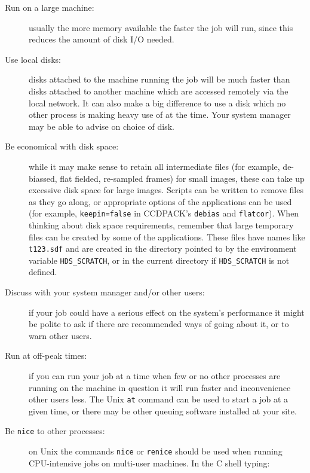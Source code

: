 \documentclass[twoside,11pt]{starlink}
\begin{document}
\begin{description}

  \item[Run on a large machine:] usually the more memory available the
   faster the job will run, since this reduces the amount of disk I/O needed.

  \item[Use local disks:] disks attached to the machine running the job will
   be much faster than disks attached to another machine which are accessed
   remotely via the local network.
   It can also make a big difference to use a disk which
   no other process is making heavy use of at the time.
   Your system manager may be able to advise on choice of disk.

  \item[Be economical with disk space:] while it may make sense to retain
   all intermediate files (for example, de-biassed, flat fielded, re-sampled
   frames) for small images, these can take up excessive disk space
   for large images.
   Scripts can be written to remove files as they go along,
   or appropriate options of the applications can be used
   (for example, \texttt{keepin=false} in CCDPACK's \texttt{debias} and \texttt{flatcor}).
   When thinking about disk space requirements,
   remember that large temporary files can be created by
   some of the applications.
   These files have names like \texttt{t123.sdf} and are created in the
   directory pointed to by the environment variable \texttt{HDS\_SCRATCH},
   or in the current directory if \texttt{HDS\_SCRATCH} is not defined.

  \item[Discuss with your system manager and/or other users:] if your job
   could have a serious effect on the system's performance it might be
   polite to ask if there are recommended ways of going about it, or to
   warn other users.

  \item[Run at off-peak times:] if you can run your job at a time when few
   or no other processes are running on the machine in question it will
   run faster and inconvenience other users less.
   The Unix \texttt{at} command can be used to start a job at a given time, or
   there may be other queuing software installed at your site.

  \item[Be \texttt{nice} to other processes:] on Unix the commands \texttt{nice}
   or \texttt{renice} should be used when running CPU-intensive jobs on
   multi-user machines.
   In the C shell typing:


\end{description}
\end{document}
